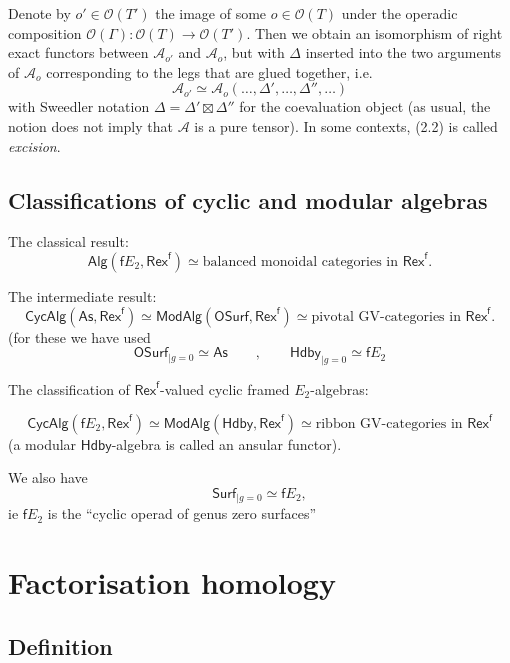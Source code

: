 \documentclass[11pt]{article}
\newcommand{\Rexf}{\mathsf{Rex}^{\mathsf{f}}}
\newcommand{\Surf}{\mathsf{Surf}}
\newcommand{\OSurf}{\mathsf{OSurf}}
\newcommand{\Hbdy}{\mathsf{Hdby}}
\newcommand{\Alg}{\mathsf{Alg}}
\newcommand{\CycAlg}{\mathsf{CycAlg}}
\newcommand{\ModAlg}{\mathsf{ModAlg}}
\newcommand{\As}{\mathsf{As}}
\theoremstyle{definition}
\begin{document}
Denote by $o' \in \mathcal{O}(T')$ the image of some $o \in \mathcal{O}(T)$ under the operadic composition $\mathcal{O}(\Gamma) : \mathcal{O}(T) \to \mathcal{O}(T')$. Then we obtain an isomorphism of right exact functors between $\mathcal{A}_{o'}$ and $\mathcal{A}_o$, but with $\Delta$ inserted into the two arguments of $\mathcal{A}_o$ corresponding to the legs that are glued together, i.e.
\begin{equation}
\mathcal{A}_{o'} \simeq \mathcal{A}_o(\dots, \Delta', \dots, \Delta'', \dots) \tag{2.2}
\end{equation}
with Sweedler notation $\Delta = \Delta' \boxtimes \Delta''$ for the coevaluation object (as usual, the notion does not imply that $\mathcal{A}$ is a pure tensor). In some contexts, (2.2) is called \textit{excision}.




\subsection{Classifications of cyclic and modular algebras}

The classical result:
$$ \Alg (\mathsf{f}E_2, \Rexf) \simeq \text{balanced monoidal categories in } \Rexf.$$

The intermediate result:
$$  \CycAlg (\As, \Rexf) \simeq \ModAlg(\OSurf, \Rexf) \simeq \text{pivotal GV-categories in } \Rexf.      $$
(for these we have used
$$\OSurf_{| g=0} \simeq \As \qquad , \qquad  \Hbdy_{|g=0} \simeq \mathsf{f}E_2$$

The classification of $\Rexf$-valued cyclic framed $E_2$-algebras:

$$ \CycAlg (\mathsf{f}E_2, \Rexf) \simeq  \ModAlg (\Hbdy, \Rexf) \simeq \text{ribbon GV-categories in } \Rexf$$
(a modular $\Hbdy$-algebra is called an ansular functor).




We also have $$\Surf_{| g=0} \simeq \mathsf{f}E_2,$$
ie $\mathsf{f}E_2$ is the ``cyclic operad of genus zero surfaces''





\section{Factorisation homology}


\subsection{Definition}
\end{document}
